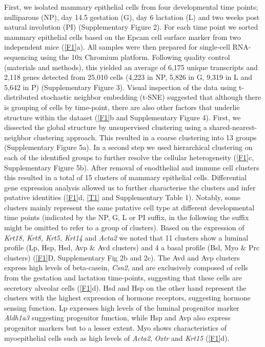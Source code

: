 \documentclass[titlepage, 12pt, oneside]{amsart}
\begin{document}
First, we isolated mammary epithelial cells from four developmental time points; nulliparous (NP), day 14.5 gestation (G), day 6 lactation (L) and two weeks post natural involution (PI) (Supplementary Figure 2).
For each time point we sorted mammary epithelial cells based on the Epcam cell surface marker from two independent mice (\autoref{F1}a).
All samples were then prepared for single-cell RNA-sequencing using the 10x Chromium platform\autocite{Zheng2017}.
Following quality control (materials and methods), this yielded an average of 6,175 unique transcripts and 2,118 genes detected from 25,010 cells (4,223 in NP, 5,826 in G, 9,319 in L and 5,642 in P) (Supplementary Figure 3).
Visual inspection of the data using t-distributed stochastic neighbor embedding (t-SNE) suggested that although there is grouping of cells by time-point, there are also other factors that underlie structure within the dataset (\autoref{F1}b and Supplementary Figure 4).
First, we dissected the global structure by unsupervised clustering using a shared-nearest-neighbor clustering approach.
This resulted in a coarse clustering into 13 groups (Supplementary Figure 5a).
In a second step we used hierarchical clustering on each of the identified groups to further resolve the cellular heterogeneity (\autoref{F1}c, Supplementary Figure 5b).
After removal of enodthelial and immune cell clusters this resulted in a total of 15 clusters of mammary epithelial cells.
Differential gene expression analysis allowed us to further characterise the clusters and infer putative identities (\autoref{F1}d, \autoref{T1} and Supplementary Table 1).
Notably, some clusters mainly represent the same putative cell type at different developmental time points (indicated by the NP, G, L or PI suffix, in the following the suffix might be omitted to refer to a group of clusters). 
Based on the expression of \textit{Krt18,} \textit{Krt8, Krt5, Krt14} and \textit{Acta2} we noted that 11 clusters show a luminal profile (Lp, Hsp, Hsd, Avp \& Avd clusters) and 4 a basal profile (Bsl, Myo \& Prc clusters) (\autoref{F1}D, Supplementary Fig 2b and 2c).
The Avd and Avp clusters express high levels of beta-casein, \textit{Csn2}, and are exclusively composed of cells from the gestation and lactation time-points, suggesting that these cells are secretory alveolar cells (\autoref{F1}d).
Hsd and Hsp on the other hand represent the clusters with the highest expression of hormone receptors, suggesting hormone sensing function.
Lp expresses high levels of the luminal progenitor marker \textit{Aldh1a3} suggesting progenitor function, while Hsp and Avp also express progenitor markers but to a lesser extent.
Myo shows characteristics of myoepithelial cells such as high levels of \textit{Acta2}, \textit{Oxtr} and \textit{Krt15} (\autoref{F1}d).
\end{document}
